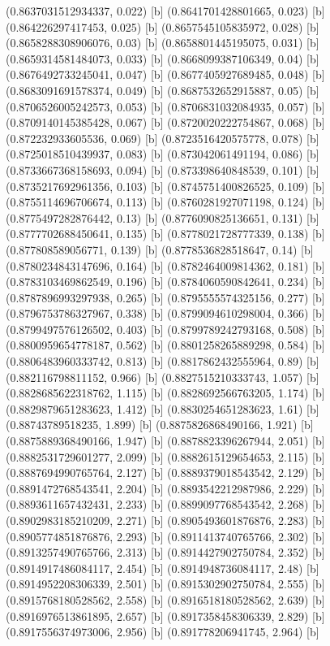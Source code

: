 {{{(0.8637031512934337, 0.022) [b] 
(0.8641701428801665, 0.023) [b] 
(0.864226297417453, 0.025) [b] 
(0.8657545105835972, 0.028) [b] 
(0.8658288308906076, 0.03) [b] 
(0.8658801445195075, 0.031) [b] 
(0.8659314581484073, 0.033) [b] 
(0.8668099387106349, 0.04) [b] 
(0.8676492733245041, 0.047) [b] 
(0.8677405927689485, 0.048) [b] 
(0.8683091691578374, 0.049) [b] 
(0.8687532652915887, 0.05) [b] 
(0.8706526005242573, 0.053) [b] 
(0.8706831032084935, 0.057) [b] 
(0.8709140145385428, 0.067) [b] 
(0.8720020222754867, 0.068) [b] 
(0.872232933605536, 0.069) [b] 
(0.8723516420575778, 0.078) [b] 
(0.8725018510439937, 0.083) [b] 
(0.873042061491194, 0.086) [b] 
(0.8733667368158693, 0.094) [b] 
(0.873398640848539, 0.101) [b] 
(0.8735217692961356, 0.103) [b] 
(0.8745751400826525, 0.109) [b] 
(0.8755114696706674, 0.113) [b] 
(0.8760281927071198, 0.124) [b] 
(0.8775497282876442, 0.13) [b] 
(0.8776090825136651, 0.131) [b] 
(0.8777702688450641, 0.135) [b] 
(0.8778021728777339, 0.138) [b] 
(0.877808589056771, 0.139) [b] 
(0.8778536828518647, 0.14) [b] 
(0.8780234843147696, 0.164) [b] 
(0.8782464009814362, 0.181) [b] 
(0.8783103469862549, 0.196) [b] 
(0.8784060590842641, 0.234) [b] 
(0.8787896993297938, 0.265) [b] 
(0.8795555574325156, 0.277) [b] 
(0.8796753786327967, 0.338) [b] 
(0.8799094610298004, 0.366) [b] 
(0.8799497576126502, 0.403) [b] 
(0.8799789242793168, 0.508) [b] 
(0.8800959654778187, 0.562) [b] 
(0.8801258265889298, 0.584) [b] 
(0.8806483960333742, 0.813) [b] 
(0.8817862432555964, 0.89) [b] 
(0.882116798811152, 0.966) [b] 
(0.8827515210333743, 1.057) [b] 
(0.8828685622318762, 1.115) [b] 
(0.8828692566763205, 1.174) [b] 
(0.8829879651283623, 1.412) [b] 
(0.8830254651283623, 1.61) [b] 
(0.88743789518235, 1.899) [b] 
(0.8875826868490166, 1.921) [b] 
(0.8875889368490166, 1.947) [b] 
(0.8878823396267944, 2.051) [b] 
(0.8882531729601277, 2.099) [b] 
(0.8882615129654653, 2.115) [b] 
(0.8887694990765764, 2.127) [b] 
(0.8889379018543542, 2.129) [b] 
(0.8891472768543541, 2.204) [b] 
(0.8893542212987986, 2.229) [b] 
(0.8893611657432431, 2.233) [b] 
(0.8899097768543542, 2.268) [b] 
(0.8902983185210209, 2.271) [b] 
(0.8905493601876876, 2.283) [b] 
(0.8905774851876876, 2.293) [b] 
(0.8911413740765766, 2.302) [b] 
(0.8913257490765766, 2.313) [b] 
(0.8914427902750784, 2.352) [b] 
(0.8914917486084117, 2.454) [b] 
(0.8914948736084117, 2.48) [b] 
(0.8914952208306339, 2.501) [b] 
(0.8915302902750784, 2.555) [b] 
(0.8915768180528562, 2.558) [b] 
(0.8916518180528562, 2.639) [b] 
(0.8916976513861895, 2.657) [b] 
(0.8917358458306339, 2.829) [b] 
(0.8917556374973006, 2.956) [b] 
(0.891778206941745, 2.964) [b] 
}}}
